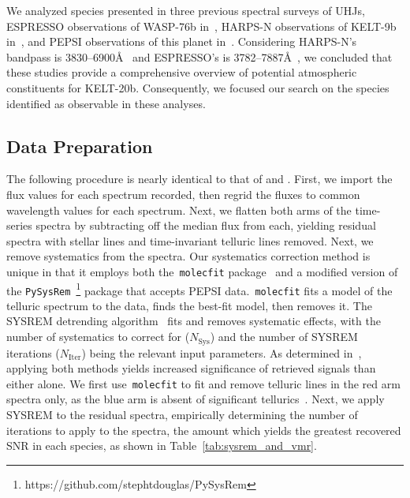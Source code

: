 \documentclass[twocolumn]{aastex631}
\newcommand{\code}[1]{\texttt{#1}}
\begin{document}
            We analyzed species presented in three previous spectral surveys of UHJs, ESPRESSO observations of WASP-76b in~\citet{Kesseli2022}, HARPS-N observations of KELT-9b in~\citet{Hoeijmakers2019}, and PEPSI observations of this planet in~\citet{Petz2023}. Considering HARPS-N's bandpass is 3830--6900\AA~\citep{Cosentino2012} and ESPRESSO's is 3782--7887\AA~\citep{Pepe2021}, we concluded that these studies provide a comprehensive overview of potential atmospheric constituents for KELT-20b. Consequently, we focused our search on the species identified as observable in these analyses.
            
        \subsection{Data Preparation}\label{subsec:Data Preparation}
            The following procedure is nearly identical to that of \citet{Johnson2023} and \citet{Petz2023}. First, we import the flux values for each spectrum recorded, then regrid the fluxes to common wavelength values for each spectrum. Next, we flatten both arms of the time-series spectra by subtracting off the median flux from each, yielding residual spectra with stellar lines and time-invariant telluric lines removed. Next, we remove systematics from the spectra. Our systematics correction method is unique in that it employs both the~\code{molecfit} package~\citep{Smette2015, Kausch2015} and a modified version of the \code{PySysRem}~\footnote{https://github.com/stephtdouglas/PySysRem} package that accepts PEPSI data.~\code{molecfit} fits a model of the telluric spectrum to the data, finds the best-fit model, then removes it. The SYSREM detrending algorithm~\citep{Tamuz2005} fits and removes systematic effects, with the number of systematics to correct for ($N_{\mathrm{Sys}}$) and the number of SYSREM iterations ($N_{\mathrm{Iter}}$) being the relevant input parameters. As determined in~\citet{Johnson2023}, applying both methods yields increased significance of retrieved signals than either alone. We first use~\code{molecfit} to fit and remove telluric lines in the red arm spectra only, as the blue arm is absent of significant tellurics~\citep{Smette2015}. Next, we apply SYSREM to the residual spectra, empirically determining the number of iterations to apply to the spectra, the amount which yields the greatest recovered SNR in each species, as shown in Table~\ref{tab:sysrem_and_vmr}.
\end{document}
